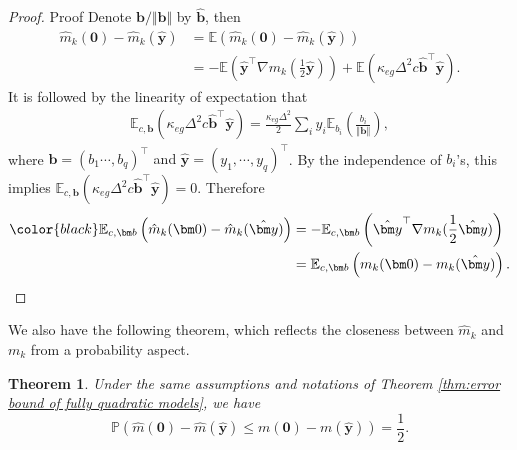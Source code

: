 \documentclass[colorlinks=true, linkcolor=blue, citecolor=blue, urlcolor=blue]{article}
\theoremstyle{plain}
\newtheorem{theorem}{Theorem}[section]
\theoremstyle{definition}
\theoremstyle{remark}
\begin{document}
\begin{proof}{Proof}
Denote $\bm b/\Vert\bm b\Vert$ by $\hat{\bm b}$, then
    \begin{equation*}
    \begin{aligned}
       \hat{m}_k(\bm 0)-\hat{m}_k(\hat{\bm y})&=\mathbb{E}(\hat{m}_k(\bm 0)-\hat{m}_k(\hat{\bm y}))\\
       &=-\mathbb{E}\left(\hat{\bm y}^\top\nabla m_k(\frac{1}{2}\hat{\bm y}) \right)+\mathbb{E}(\kappa_{eg}\Delta^2c\hat{\bm b}^\top\hat{\bm y}).
    \end{aligned}    
    \end{equation*}
It is followed by the linearity of expectation that
\begin{equation*}
\begin{aligned}
     \mathbb{E}_{c,\bm b}(\kappa_{eg}\Delta^2c\hat{\bm b}^\top \hat{\bm y})=\frac{\kappa_{eg}\Delta^2}{2}\sum_{i}y_i\mathbb{E}_{b_i}(\frac{b_i}{\Vert\bm b\Vert}),
\end{aligned}   
\end{equation*}
where {\color{black}$\bm b=(b_1\cdots,b_q)^\top$ and $\hat{\bm y}=(y_1,\cdots,y_q)^\top$}. By the independence of $b_i$'s, this implies $\mathbb{E}_{c,\bm b}(\kappa_{eg}\Delta^2c\hat{\bm b}^\top\hat{\bm y})=0$. Therefore
\begin{equation*}
\begin{aligned}
     {\color{black}\mathbb{E}_{c,\bm b}}\left(\hat{m}_k(\bm 0)-\hat{m}_k(\hat{\bm y})\right)&= -\mathbb{E}_{c,\bm b}\left(\hat{\bm y}^\top\nabla m_k(\frac{1}{2}\hat{\bm y})\right)\\
     &=\mathbb{E}_{c,\bm b}\left(m_k(\bm 0)-m_k(\hat{\bm y})\right).
\end{aligned}
\end{equation*}  

\end{proof}

We also have the following theorem, which reflects the closeness between $\hat{m}_k$ and $m_k$ from a probability aspect.
\begin{theorem}
    Under the same assumptions and notations of Theorem \ref{thm:error bound of fully quadratic models}, we have
    \begin{equation*}
        \mathbb{P}\left(\hat{m}(\bm 0)-\hat{m}(\hat{\bm y})\leq m(\bm 0)-m(\hat{\bm y})\right)=\frac{1}{2}.
    \end{equation*}
\end{theorem}
\end{document}
